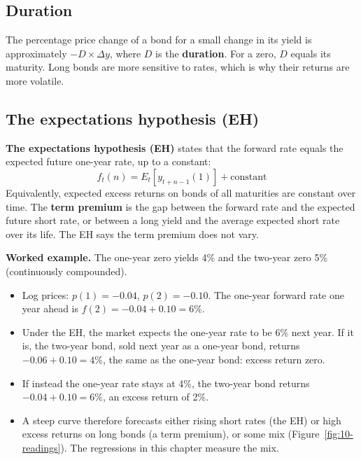 \subsection{Duration}

The percentage price change of a bond for a small change in its yield is approximately $-D \times \Delta y$, where $D$ is the \textbf{duration}. For a zero, $D$ equals its maturity. Long bonds are more sensitive to rates, which is why their returns are more volatile.

\subsection{The expectations hypothesis (EH)}

\textbf{The expectations hypothesis (EH)} states that the forward rate equals the expected future one-year rate, up to a constant:
\begin{equation}
  f_t(n) = E_t\!\left[y_{t+n-1}(1)\right] + \text{constant}
  \label{eq:10-eh}
\end{equation}
Equivalently, expected excess returns on bonds of all maturities are constant over time. The \textbf{term premium} is the gap between the forward rate and the expected future short rate, or between a long yield and the average expected short rate over its life. The EH says the term premium does not vary.

\textbf{Worked example.} The one-year zero yields 4\% and the two-year zero 5\% (continuously compounded).

\begin{itemize}
  \item Log prices: $p(1) = -0.04$, $p(2) = -0.10$. The one-year forward rate one year ahead is $f(2) = -0.04 + 0.10 = 6\%$.
  \item Under the EH, the market expects the one-year rate to be 6\% next year. If it is, the two-year bond, sold next year as a one-year bond, returns $-0.06 + 0.10 = 4\%$, the same as the one-year bond: excess return zero.
  \item If instead the one-year rate stays at 4\%, the two-year bond returns $-0.04 + 0.10 = 6\%$, an excess return of 2\%.
  \item A steep curve therefore forecasts either rising short rates (the EH) or high excess returns on long bonds (a term premium), or some mix (Figure~\ref{fig:10-readings}). The regressions in this chapter measure the mix.
\end{itemize}

